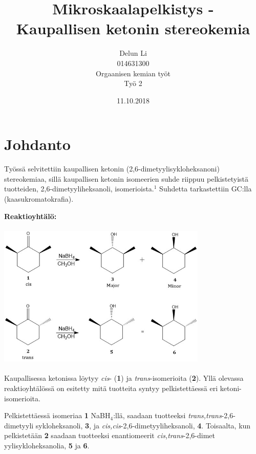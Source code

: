 \documentclass[11pt,a4paper]{article}
\title{Mikroskaalapelkistys - 
\\Kaupallisen ketonin stereokemia}
\author{Delun Li\\014631300\\Orgaanisen kemian työt\\Työ 2}
\date{11.10.2018}
\begin{document}
\maketitle

\pagebreak

\section{Johdanto}

\noindent Työssä selvitettiin kaupallisen ketonin (2,6-dimetyylisykloheksanoni) stereokemiaa, sillä kaupallisen ketonin isomeerien suhde riippuu pelkistetyistä tuotteiden, 2,6-dimetyyliheksanoli, isomerioista.$^1$ Suhdetta tarkastettiin GC:lla (kaasukromatokrafia). 


\vspace{0.3cm}

\noindent \textbf{Reaktioyhtälö:}

\vspace{0.3cm}

\hspace{0.7cm}\includegraphics[height = 7cm, width = 10cm]{mikroskaalayht.jpg}

\noindent Kaupallisessa ketonissa löytyy \textit{cis}- (\textbf{1}) ja \textit{trans}-isomerioita (\textbf{2}). Yllä olevassa reaktioyhtälössä on esitetty mitä tuotteita syntyy pelkistettäessä eri ketoni-isomerioita. 

Pelkistettäessä isomeriaa \textbf{1} NaBH$_4$:llä, saadaan tuotteeksi \textit{trans,trans}-2,6-dimetyyli\- sykloheksanoli, \textbf{3}, ja \textit{cis,cis}-2,6-dimetyyliheksanoli, \textbf{4}. Toisaalta, kun pelkistetään \textbf{2} saadaan tuotteeksi enantiomeerit \textit{cis,trans}-2,6-dimet\- yylisykloheksanolia, \textbf{5} ja \textbf{6}.


\vspace{1cm}
\end{document}
